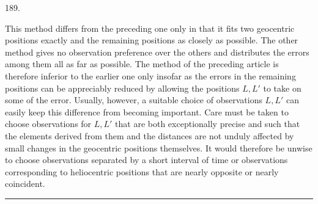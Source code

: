 \begin{center}\hypertarget{native-262-article189}{}189.\end{center}
This method differs from the preceding one only in that it fits two geocentric
positions exactly and the remaining positions as closely as possible. The
other method gives no observation preference over the others and distributes
the errors among them all as far as possible\rlap{\raisebox{1.4ex}{\rule{.6em}{.35pt}}}.
The method of the preceding article is therefore inferior to the earlier one
only insofar as the errors in the remaining positions can be appreciably
reduced by allowing the positions $L,L'$ to take on some of the error.
Usually, however, a suitable choice of observations $L,L'$ can easily keep
this difference from becoming important. Care must be taken to
choose observations for $L,L'$ that are both exceptionally precise and such
that the elements derived from them and the distances are not unduly affected
by small changes in the geocentric positions themselves. It would therefore
be unwise to choose observations separated by a short interval of time or
observations corresponding to heliocentric positions that are nearly opposite
or nearly coincident.
\begin{center}\rule{3cm}{.4pt}\end{center}
